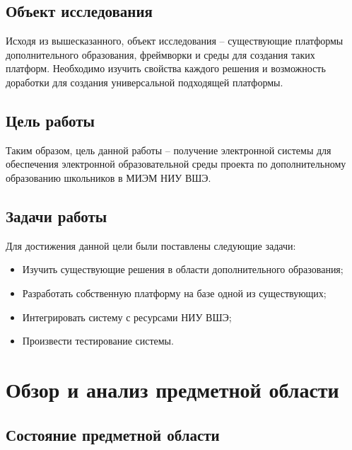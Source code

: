 \documentclass[a4paper,14pt]{article}
\begin{document}
\subsection{Объект исследования}

Исходя из вышесказанного, объект исследования -- существующие платформы дополнительного образования, фреймворки и среды для создания таких платформ.
Необходимо изучить свойства каждого решения и возможность доработки для создания универсальной подходящей платформы.


\subsection{Цель работы}
Таким образом, цель данной работы -- получение электронной системы для обеспечения электронной образовательной среды проекта по дополнительному образованию школьников в МИЭМ НИУ ВШЭ.

\subsection{Задачи работы}
Для достижения данной цели были поставлены следующие задачи:
\begin{itemize}
	\item Изучить существующие решения в области дополнительного образования;
	\item Разработать собственную платформу на базе одной из существующих;
	\item Интегрировать систему с ресурсами НИУ ВШЭ;
	\item Произвести тестирование системы.
\end{itemize}




\pagebreak


\section{Обзор и анализ предметной области}


\subsection{Состояние предметной области}
\end{document}
